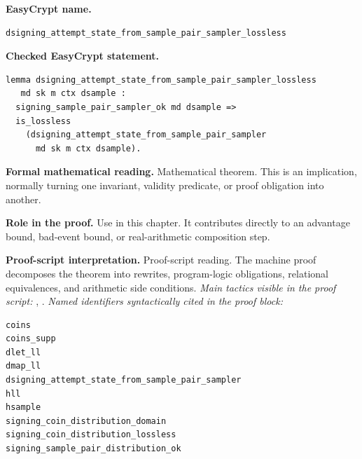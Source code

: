 \begin{formaltheorem}
\noindent\textbf{EasyCrypt name.}
\begin{lstlisting}[language=EasyCrypt,basicstyle=\ttfamily\scriptsize]
dsigning_attempt_state_from_sample_pair_sampler_lossless
\end{lstlisting}
\noindent\textbf{Checked EasyCrypt statement.}
\begin{lstlisting}[language=EasyCrypt,basicstyle=\ttfamily\scriptsize]
lemma dsigning_attempt_state_from_sample_pair_sampler_lossless
   md sk m ctx dsample :
  signing_sample_pair_sampler_ok md dsample =>
  is_lossless
    (dsigning_attempt_state_from_sample_pair_sampler
      md sk m ctx dsample).
\end{lstlisting}
\noindent\textbf{Formal mathematical reading.}
Mathematical theorem. This is an implication, normally turning one invariant, validity predicate, or proof obligation into another.

\noindent\textbf{Role in the proof.}
Use in this chapter. It contributes directly to an advantage bound, bad-event bound, or real-arithmetic composition step.

\noindent\textbf{Proof-script interpretation.}
Proof-script reading. The machine proof decomposes the theorem into rewrites, program-logic obligations, relational equivalences, and arithmetic side conditions.
\emph{Main tactics visible in the proof script:} , .
\emph{Named identifiers syntactically cited in the proof block:}
\begin{lstlisting}[language=EasyCrypt,basicstyle=\ttfamily\scriptsize]
coins
coins_supp
dlet_ll
dmap_ll
dsigning_attempt_state_from_sample_pair_sampler
hll
hsample
signing_coin_distribution_domain
signing_coin_distribution_lossless
signing_sample_pair_distribution_ok
\end{lstlisting}

\end{formaltheorem}

